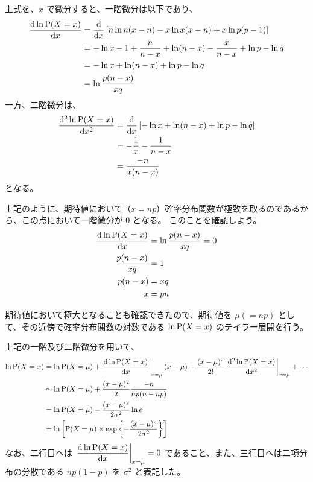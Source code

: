 \documentclass[11pt]{jsarticle}
\newcommand{\diff}{\mathrm d}
\newcommand{\difd}[2]{\dfrac{\diff #1}{\diff #2}}
\newcommand{\difdd}[2]{\dfrac{\diff^2 #1}{\diff #2^2}}
\begin{document}
\begin{appendix}
上式を、$x$ で微分すると、一階微分は以下であり、
\begin{align}
\difd{\ln {\rm P}(X=x)}{x} 
	&= \difd{}{x} \left[n\ln n(x-n) - x\ln x(x-n) + x\ln p(p-1) \right] \notag \\
	&= - \ln {x} -1 + \dfrac{n}{n - x} + \ln(n-x) -\dfrac{x}{n-x} + \ln{p} - \ln{q} \notag \\
	&= - \ln {x} + \ln(n-x) + \ln{p} - \ln{q} \notag \\
	&= \ln \dfrac{p(n-x)}{xq}
\end{align}
一方、二階微分は、
\begin{align}
\difdd{\ln {\rm P}(X=x)}{x} 
	&= \difd{}{x} \left[- \ln {x} + \ln(n-x) + \ln{p} - \ln{q} \right] \notag \\
	&= -\dfrac{1}{x} -\dfrac{1}{n-x} \notag \\
	&= \dfrac{-n}{x(n-x)}
\end{align}
となる。

上記のように、期待値において（$x=np$）確率分布関数が極致を取るのであるから、この点において一階微分が $0$ となる。
このことを確認しよう。
\begin{align}
\difd{\ln {\rm P}(X=x)}{x} &= \ln \dfrac{p(n-x)}{xq} = 0 \notag \\
\dfrac{p(n-x)}{xq} &= 1 \notag \\
p(n-x) &= xq \notag \\
x &= pn
\end{align}

期待値において極大となることも確認できたので、期待値を $\mu (= np)$ として、その近傍で確率分布関数の対数である $\ln {\rm P}(X=x)$ のテイラー展開を行う。

上記の一階及び二階微分を用いて、
\begin{align}
\ln {\rm P}(X=x) 
	&= \ln {\rm P}(X=\mu) + \left. \difd{\ln {\rm P}(X=x)}{x} \right|_{x=\mu} (x-\mu) + \dfrac{(x-\mu)^2}{2!} \left. \difdd{\ln {\rm P}(X=x)}{x} \right|_{x=\mu} +\cdots \notag \\
	&\sim \ln {\rm P}(X=\mu) + \dfrac{(x-\mu)^2}{2} \dfrac{-n}{np(n-np)} \notag \\
	&= \ln {\rm P}(X=\mu) - \dfrac{(x-\mu)^2}{2 \sigma^2} \ln e \notag \\
	&= \ln \left[{\rm P}(X=\mu) \times \exp \left\{ -\dfrac{(x-\mu)^2}{2 \sigma^2} \right\} \right]
\end{align}
なお、二行目へは $\left. \difd{\ln {\rm P}(X=x)}{x} \right|_{x=\mu} =0$ であること、また、三行目へは二項分布の分散である $np(1-p)$ を $\sigma^2$ と表記した。


\end{appendix}
\end{document}
